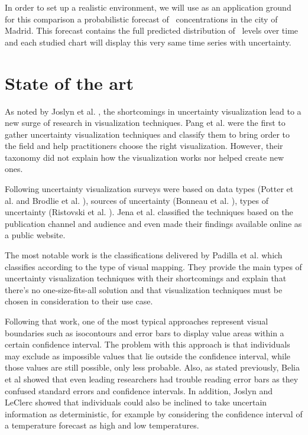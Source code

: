 \documentclass[a4paper,3p,sort&compress]{elsarticle}
\begin{document}
In order to set up a realistic environment, we will use as an application ground
for this comparison a probabilistic forecast of \no~concentrations in the city
of Madrid. This forecast contains the full predicted distribution of \no~levels
over time and each studied chart will display this very same time series with
uncertainty.

\section{State of the art}
\label{sec:results}

As noted by Joslyn et al. \cite{joslyn_communicating_2010}, the shortcomings in
uncertainty visualization lead to a new surge of research in visualization
techniques. Pang et al. \cite{pang_approaches_1997} were the first to gather
uncertainty visualization techniques and classify them to bring order to the
field and help practitioners choose the right visualization. However, their
taxonomy did not explain how the visualization works nor helped create new ones.

Following uncertainty visualization surveys were based on data types (Potter et
al. \cite{potter_quantification_2012} and Brodlie et al.
\cite{brodlie_review_2012}), sources of uncertainty (Bonneau et al.
\cite{bonneau_overview_2014}), types of uncertainty (Ristovski et al.
\cite{ristovski_uncertainty_2014}). Jena et al. \cite{jena_uncertainty_2020}
classified the techniques based on the publication channel and audience and even
made their findings available online as a public website.

The most notable work is the classifications delivered by Padilla et al.
\cite{padilla_uncertainty_2021} which classifies according to the type of visual
mapping. They provide the main types of uncertainty visualization techniques
with their shortcomings and explain that there's no one-size-fits-all solution
and that visualization techniques must be chosen in consideration to their use
case.

Following that work, one of the most typical approaches represent visual
boundaries such as isocontours and error bars to display value areas within a
certain confidence interval. The problem with this approach is that individuals
may exclude as impossible values that lie outside the confidence interval, while
those values are still possible, only less probable. Also, as stated previously,
Belia et al \cite{belia_researchers_2005} showed that even leading researchers
had trouble reading error bars as they confused standard errors and confidence
intervals. In addition, Joslyn and LeClerc \cite{joslyn_decisions_2013} showed
that individuals could also be inclined to take uncertain information as
deterministic, for example by considering the confidence interval of a
temperature forecast as high and low temperatures.
\end{document}
